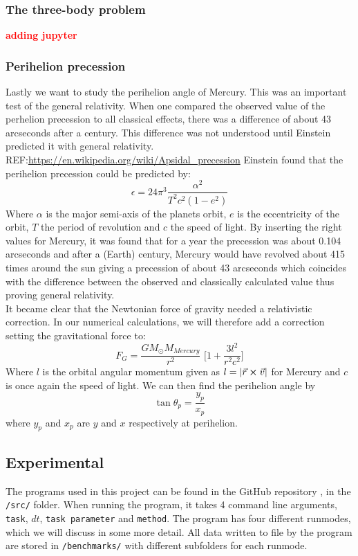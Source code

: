 \documentclass{article}
\newcommand\red[1]{\textcolor{red}{\textbf{#1}}}
\newcommand{\husk}[1]{\color{red} #1 \color{black}}
\newcommand{\TomH}[1]{\Big[ #1 \Big]}
\begin{document}
\subsubsection{The three-body problem}
\red{adding jupyter}

\subsubsection{Perihelion precession}
Lastly we want to study the perihelion angle of Mercury. This was an important test of the general relativity. When one compared the observed value of the perhelion precession to all classical effects, there was a difference of about 43 arcseconds after a century. This difference was not understood until Einstein predicted it with general relativity.\husk{REF:\url{https://en.wikipedia.org/wiki/Apsidal_precession}} Einstein found that the perihelion precession could be predicted by:
\begin{equation}
\epsilon = 24 \pi^3 \frac{\alpha^2}{T^2 c^2 (1 - e^2)}
\label{eq:perihelion}
\end{equation}
Where $\alpha$ is the major semi-axis of the planets orbit, $e$ is the eccentricity of the orbit, $T$ the period of revolution and $c$ the speed of light. By inserting the right values for Mercury, it was found that for a year the precession was about 0.104 arcseconds and after a (Earth) century, Mercury would have revolved about 415 times around the sun giving a precession of about 43 arcseconds which coincides with the difference between the observed and classically calculated value thus proving general relativity. \\
It became clear that the Newtonian force of gravity needed a relativistic correction. In our numerical calculations, we will therefore add a correction setting the gravitational force to:
\begin{equation}
F_G = \frac{G M_{\odot} M_{Mercury}}{r^2} \, \, \TomH{1 + \frac{3l^2}{r^2c^2}}
\label{eq:FgGR}
\end{equation}
Where $l$ is the orbital angular momentum given as $l = |\vec{r} \cross \vec{v}|$ for Mercury and $c$ is once again the speed of light.
We can then find the perihelion angle by
\begin{equation}
\tan \theta_p = \frac{y_p}{x_p}
\end{equation}
where $y_p$ and $x_p$ are $y$ and $x$ respectively at perihelion.
\subsection{Experimental}
The programs used in this project can be found in the GitHub repository \cite{Github}, in the \texttt{/src/} folder. When running the program, it takes 4 command line arguments, \texttt{task}, $dt$, \texttt{task parameter} and \texttt{method}. The program has four different runmodes, which we will discuss in some more detail. All data written to file by the program are stored in \texttt{/benchmarks/} with different subfolders for each runmode.
\end{document}
